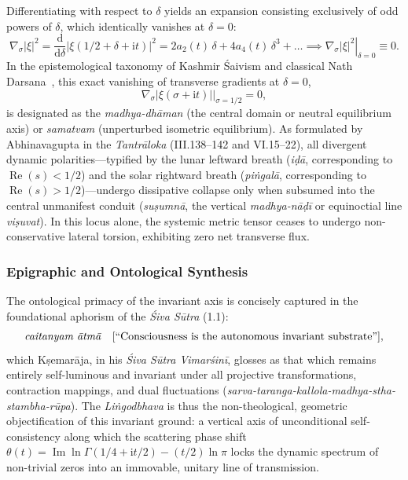 \documentclass[11pt,a4paper,reqno]{article}
\theoremstyle{plain}
\theoremstyle{definition}
\theoremstyle{remark}
\numberwithin{equation}{section}
\providecommand{\diff}{\mathrm{d}}
\begin{document}
Differentiating with respect to $\delta$ yields an expansion consisting exclusively of odd powers of $\delta$, which identically vanishes at $\delta = 0$:
\begin{equation}
  \nabla_\sigma |\xi|^2 = \frac{\diff}{\diff\delta} \big| \xi(1/2 + \delta + \mathrm{i}t) \big|^2 = 2 a_2(t)\,\delta + 4 a_4(t)\,\delta^3 + \dots \implies \left. \nabla_\sigma |\xi|^2 \right|_{\delta = 0} \equiv 0.
  \label{eq:gradient_vanishing_proof}
\end{equation}
In the epistemological taxonomy of Kashmir \'{S}aivism and classical Nath Darsana~\cite{NathDarsanaV2Monograph2026}, this exact vanishing of transverse gradients at $\delta = 0$,
\begin{equation}
  \left. \nabla_\sigma |\xi(\sigma + \mathrm{i}t)| \right|_{\sigma = 1/2} = 0,
\end{equation}
is designated as the \emph{madhya-dh\={a}man} (the central domain or neutral equilibrium axis) or \emph{samatvam} (unperturbed isometric equilibrium). As formulated by Abhinavagupta in the \emph{Tantr\={a}loka} (III.138--142 and VI.15--22), all divergent dynamic polarities---typified by the lunar leftward breath (\emph{i\d{d}\={a}}, corresponding to $\operatorname{Re}(s) < 1/2$) and the solar rightward breath (\emph{pi\.{n}gal\={a}}, corresponding to $\operatorname{Re}(s) > 1/2$)---undergo dissipative collapse only when subsumed into the central unmanifest conduit (\emph{su\d{s}umn\={a}}, the vertical \emph{madhya-n\={a}\d{d}\={i}} or equinoctial line \emph{vi\d{s}uvat}). In this locus alone, the systemic metric tensor ceases to undergo non-conservative lateral torsion, exhibiting zero net transverse flux.

\subsubsection{Epigraphic and Ontological Synthesis}
The ontological primacy of the invariant axis is concisely captured in the foundational aphorism of the \emph{\'{S}iva S\={u}tra} (1.1):
\begin{equation}
  \text{\textit{caitanyam \={a}tm\={a}}} \quad \text{[``Consciousness is the autonomous invariant substrate'']},
\end{equation}
which K\d{s}emar\={a}ja, in his \emph{\'{S}iva S\={u}tra Vimar\'{s}in\={i}}, glosses as that which remains entirely self-luminous and invariant under all projective transformations, contraction mappings, and dual fluctuations (\emph{sarva-taranga-kallola-madhya-stha-stambha-r\={u}pa}). The \emph{Li\.{n}godbhava} is thus the non-theological, geometric objectification of this invariant ground: a vertical axis of unconditional self-consistency along which the scattering phase shift $\theta(t) = \operatorname{Im} \ln \Gamma(1/4 + \mathrm{i}t/2) - (t/2)\ln \pi$ locks the dynamic spectrum of non-trivial zeros into an immovable, unitary line of transmission.
\end{document}
